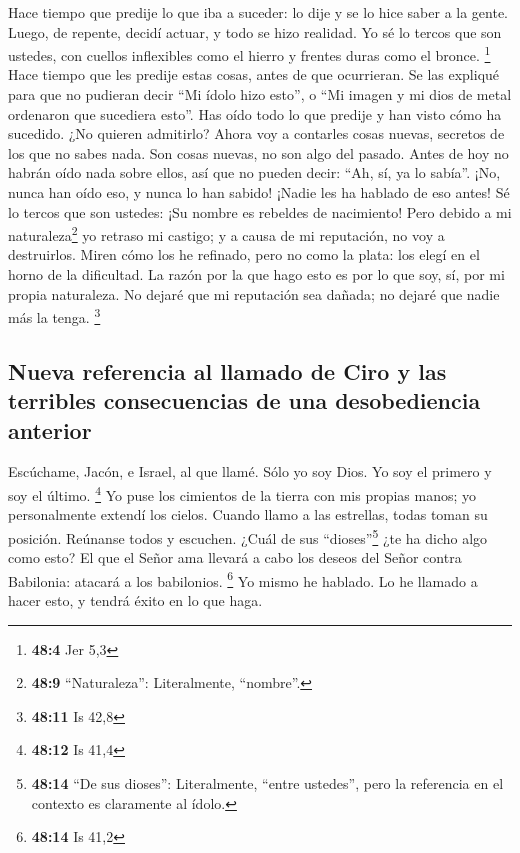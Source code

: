  Hace tiempo que predije lo que iba a suceder: lo dije y
se lo hice saber a la gente. Luego, de repente, decidí actuar, y todo se
hizo realidad.  Yo sé lo tercos que son ustedes, con
cuellos inflexibles como el hierro y frentes duras como el bronce.
\footnote{\textbf{48:4} Jer 5,3}  Hace tiempo que les
predije estas cosas, antes de que ocurrieran. Se las expliqué para que
no pudieran decir ``Mi ídolo hizo esto'', o ``Mi imagen y mi dios de
metal ordenaron que sucediera esto''.  Has oído todo lo
que predije y han visto cómo ha sucedido. ¿No quieren admitirlo? Ahora
voy a contarles cosas nuevas, secretos de los que no sabes nada.
 Son cosas nuevas, no son algo del pasado. Antes de hoy no
habrán oído nada sobre ellos, así que no pueden decir: ``Ah, sí, ya lo
sabía''.  ¡No, nunca han oído eso, y nunca lo han sabido!
¡Nadie les ha hablado de eso antes! Sé lo tercos que son ustedes: ¡Su
nombre es rebeldes de nacimiento!  Pero debido a mi
naturaleza\footnote{\textbf{48:9} ``Naturaleza'': Literalmente,
  ``nombre''.} yo retraso mi castigo; y a causa de mi reputación, no voy
a destruirlos.  Miren cómo los he refinado, pero no como
la plata: los elegí en el horno de la dificultad.  La
razón por la que hago esto es por lo que soy, sí, por mi propia
naturaleza. No dejaré que mi reputación sea dañada; no dejaré que nadie
más la tenga. \footnote{\textbf{48:11} Is 42,8}

\hypertarget{nueva-referencia-al-llamado-de-ciro-y-las-terribles-consecuencias-de-una-desobediencia-anterior}{%
\subsection{Nueva referencia al llamado de Ciro y las terribles
consecuencias de una desobediencia
anterior}\label{nueva-referencia-al-llamado-de-ciro-y-las-terribles-consecuencias-de-una-desobediencia-anterior}}

 Escúchame, Jacón, e Israel, al que llamé. Sólo yo soy
Dios. Yo soy el primero y soy el último. \footnote{\textbf{48:12} Is
  41,4}  Yo puse los cimientos de la tierra con mis
propias manos; yo personalmente extendí los cielos. Cuando llamo a las
estrellas, todas toman su posición.  Reúnanse todos y
escuchen. ¿Cuál de sus ``dioses''\footnote{\textbf{48:14} ``De sus
  dioses'': Literalmente, ``entre ustedes'', pero la referencia en el
  contexto es claramente al ídolo.} ¿te ha dicho algo como esto? El que
el Señor ama llevará a cabo los deseos del Señor contra Babilonia:
atacará a los babilonios. \footnote{\textbf{48:14} Is 41,2}
 Yo mismo he hablado. Lo he llamado a hacer esto, y
tendrá éxito en lo que haga.

